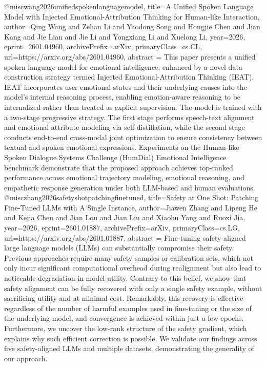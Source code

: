 {}@misc{wang2026unifiedspokenlanguagemodel,
      title={A Unified Spoken Language Model with Injected Emotional-Attribution Thinking for Human-like Interaction}, 
      author={Qing Wang and Zehan Li and Yaodong Song and Hongjie Chen and Jian Kang and Jie Lian and Jie Li and Yongxiang Li and Xuelong Li},
      year={2026},
      eprint={2601.04960},
      archivePrefix={arXiv},
      primaryClass={cs.CL},
      url={https://arxiv.org/abs/2601.04960},
      abstract = {This paper presents a unified spoken language model for emotional intelligence, enhanced by a novel data construction strategy termed Injected Emotional-Attribution Thinking (IEAT). IEAT incorporates user emotional states and their underlying causes into the model's internal reasoning process, enabling emotion-aware reasoning to be internalized rather than treated as explicit supervision. The model is trained with a two-stage progressive strategy. The first stage performs speech-text alignment and emotional attribute modeling via self-distillation, while the second stage conducts end-to-end cross-modal joint optimization to ensure consistency between textual and spoken emotional expressions. Experiments on the Human-like Spoken Dialogue Systems Challenge (HumDial) Emotional Intelligence benchmark demonstrate that the proposed approach achieves top-ranked performance across emotional trajectory modeling, emotional reasoning, and empathetic response generation under both LLM-based and human evaluations.}
}@misc{zhang2026safetyshotpatchingfinetuned,
      title={Safety at One Shot: Patching Fine-Tuned LLMs with A Single Instance}, 
      author={Jiawen Zhang and Lipeng He and Kejia Chen and Jian Lou and Jian Liu and Xiaohu Yang and Ruoxi Jia},
      year={2026},
      eprint={2601.01887},
      archivePrefix={arXiv},
      primaryClass={cs.LG},
      url={https://arxiv.org/abs/2601.01887},
      abstract = {Fine-tuning safety-aligned large language models (LLMs) can substantially compromise their safety. Previous approaches require many safety samples or calibration sets, which not only incur significant computational overhead during realignment but also lead to noticeable degradation in model utility. Contrary to this belief, we show that safety alignment can be fully recovered with only a single safety example, without sacrificing utility and at minimal cost. Remarkably, this recovery is effective regardless of the number of harmful examples used in fine-tuning or the size of the underlying model, and convergence is achieved within just a few epochs. Furthermore, we uncover the low-rank structure of the safety gradient, which explains why such efficient correction is possible. We validate our findings across five safety-aligned LLMs and multiple datasets, demonstrating the generality of our approach.}
}
